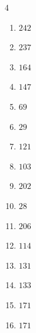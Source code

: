 \begin{multicols}{4}
\begin{enumerate}
  \item $242$


  \item $237$


  \item $164$


  \item $147$


  \item $69$


  \item $29$


  \item $121$


  \item $103$


  \item $202$


\columnbreak %

  \item $28$


  \item $206$


  \item $114$


  \item $131$


  \item $133$


  \item $171$


  \item $171$


\end{enumerate}
\end{multicols}
